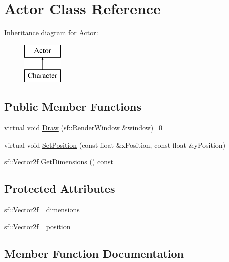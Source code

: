 \hypertarget{class_actor}{}\section{Actor Class Reference}
\label{class_actor}
Inheritance diagram for Actor\+:\begin{figure}[H]
\begin{center}
\leavevmode
\includegraphics[height=2.000000cm]{class_actor}
\end{center}
\end{figure}
\subsection*{Public Member Functions}
\begin{DoxyCompactItemize}
\item 
virtual void \hyperlink{class_actor_ad5c98db519558b3b22c03acec73b8869}{Draw} (sf\+::\+Render\+Window \&window)=0
\item 
virtual void \hyperlink{class_actor_a41012afefccde8234e574b03d9fdbc08}{Set\+Position} (const float \&x\+Position, const float \&y\+Position)
\item 
sf\+::\+Vector2f \hyperlink{class_actor_a2f63a8afe2d15b4ba695b2d4e4c8597e}{Get\+Dimensions} () const 
\end{DoxyCompactItemize}
\subsection*{Protected Attributes}
\begin{DoxyCompactItemize}
\item 
sf\+::\+Vector2f \hyperlink{class_actor_acfabf742ec617868223278c3b8f91336}{\+\_\+dimensions}
\item 
sf\+::\+Vector2f \hyperlink{class_actor_ad3760883a99be5b4aaa2635ca761c29b}{\+\_\+position}
\end{DoxyCompactItemize}


\subsection{Member Function Documentation}
\hypertarget{class_actor_ad5c98db519558b3b22c03acec73b8869}{}
